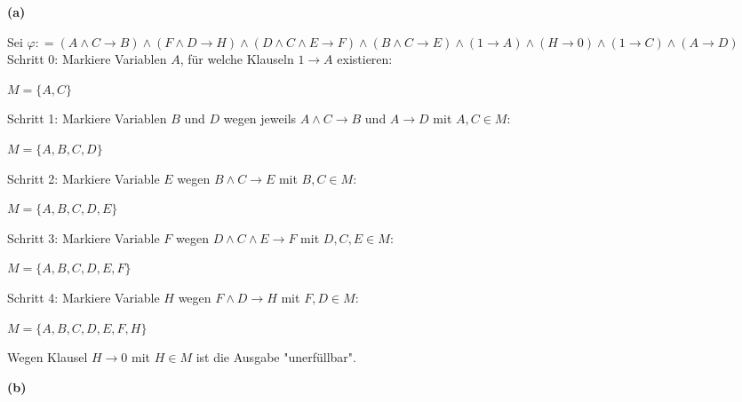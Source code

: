 \documentclass[11pt, a4paper]{article}
\newcommand{\defgr}{\mathrel{\mathop:\!\!=}}
\begin{document}
\textbf{(a)}
\begin{adjustwidth}{20pt}{20pt}
Sei $\varphi \defgr (A \wedge C \rightarrow B)\wedge(F \wedge D \rightarrow H)\wedge(D \wedge C \wedge E \rightarrow F)\wedge(B \wedge C \rightarrow E)\wedge(1 \rightarrow A)\wedge(H \rightarrow 0)\wedge(1 \rightarrow C)\wedge(A \rightarrow D)$\\

Schritt 0: Markiere Variablen $A$, für welche Klauseln $1 \rightarrow A$ existieren:\\
\begin{center}
	$M = \{A,C\}$\\
\end{center}
\vspace*{15 pt}

Schritt 1: Markiere Variablen $B$ und $D$ wegen jeweils $A \wedge C \rightarrow B$ und  $A \rightarrow D$ mit $A,C \in M$:\\
\begin{center}
	$M = \{A, B, C, D\}$\\
\end{center}
\vspace*{15 pt}

Schritt 2: Markiere Variable $E$ wegen  $B \wedge C \rightarrow E$ mit $B,C \in M$:\\
\begin{center}
	$M = \{A, B, C, D, E\}$\\
\end{center}
\vspace*{15 pt}
Schritt 3: Markiere Variable $F$ wegen  $D \wedge C \wedge E \rightarrow F$ mit $
D,C,E \in M$:\\
\begin{center}
	$M = \{A, B, C, D, E, F\}$\\
\end{center}
\vspace*{15 pt}
Schritt 4: Markiere Variable $H$ wegen  $F \wedge D \rightarrow H$ mit $
F,D \in M$:\\
\begin{center}
	$M = \{A, B, C, D, E, F, H\}$\\
\end{center}
\vspace*{15 pt}

Wegen Klausel $H \rightarrow 0$ mit $H \in M$ ist die Ausgabe "unerfüllbar".
\end{adjustwidth}
\textbf{(b)}
\end{document}
